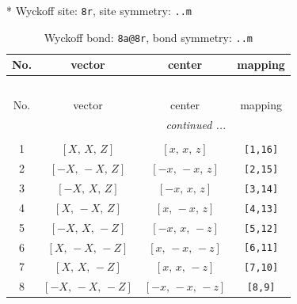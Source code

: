\documentclass[fleqn,8pt]{jsarticle}
\begin{document}
* Wyckoff site: {\tt 8r}, site symmetry: {\tt ..m}
\renewcommand{\arraystretch}{1.2}
\begin{longtable}{cccc}
\caption{Wyckoff bond: {\tt 8a@8r}, bond symmetry: {\tt ..m}}
 \\
 \hline \hline
No. & vector & center & mapping \\ \hline \endfirsthead

\multicolumn{3}{l}{\tablename\ \thetable{}} \\
 \hline \hline
No. & vector & center & mapping \\ \hline \endhead

 \hline \hline
\multicolumn{3}{r}{\footnotesize\it continued ...} \\ \endfoot

 \hline \hline
\multicolumn{3}{r}{} \\ \endlastfoot

1 & $\left[ X,\, X,\, Z \right]$ & $\left[ x,\, x,\, z \right]$ & {\tt [1,16]} \\ \hline
2 & $\left[ - X,\, - X,\, Z \right]$ & $\left[ - x,\, - x,\, z \right]$ & {\tt [2,15]} \\ \hline
3 & $\left[ - X,\, X,\, Z \right]$ & $\left[ - x,\, x,\, z \right]$ & {\tt [3,14]} \\ \hline
4 & $\left[ X,\, - X,\, Z \right]$ & $\left[ x,\, - x,\, z \right]$ & {\tt [4,13]} \\ \hline
5 & $\left[ - X,\, X,\, - Z \right]$ & $\left[ - x,\, x,\, - z \right]$ & {\tt [5,12]} \\ \hline
6 & $\left[ X,\, - X,\, - Z \right]$ & $\left[ x,\, - x,\, - z \right]$ & {\tt [6,11]} \\ \hline
7 & $\left[ X,\, X,\, - Z \right]$ & $\left[ x,\, x,\, - z \right]$ & {\tt [7,10]} \\ \hline
8 & $\left[ - X,\, - X,\, - Z \right]$ & $\left[ - x,\, - x,\, - z \right]$ & {\tt [8,9]} \\
\end{longtable}
\renewcommand{\arraystretch}{1.2}
\end{document}
